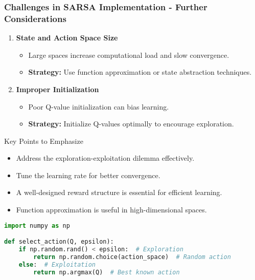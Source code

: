 \documentclass{beamer}
\begin{document}
\begin{frame}[fragile]
    \frametitle{Challenges in SARSA Implementation - Further Considerations}
    \begin{enumerate}[resume]
        \item \textbf{State and Action Space Size}
            \begin{itemize}
                \item Large spaces increase computational load and slow convergence.
                \item \textbf{Strategy:} Use function approximation or state abstraction techniques.
            \end{itemize}
        \item \textbf{Improper Initialization}
            \begin{itemize}
                \item Poor Q-value initialization can bias learning.
                \item \textbf{Strategy:} Initialize Q-values optimally to encourage exploration.
            \end{itemize}
    \end{enumerate}
    
    \begin{block}{Key Points to Emphasize}
        \begin{itemize}
            \item Address the exploration-exploitation dilemma effectively.
            \item Tune the learning rate for better convergence.
            \item A well-designed reward structure is essential for efficient learning.
            \item Function approximation is useful in high-dimensional spaces.
        \end{itemize}
    \end{block}
    
    \begin{lstlisting}[language=Python, caption={Example: $\epsilon$-greedy Policy}]
import numpy as np

def select_action(Q, epsilon):
    if np.random.rand() < epsilon:  # Exploration
        return np.random.choice(action_space)  # Random action
    else:  # Exploitation
        return np.argmax(Q)  # Best known action
    \end{lstlisting}
\end{frame}
\end{document}
